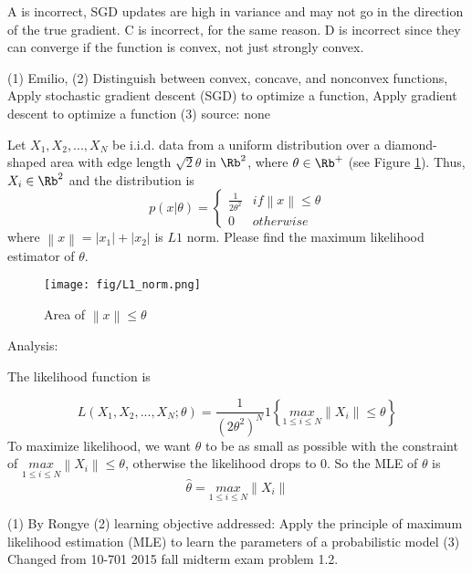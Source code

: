 \begin{questions}
\begin{soln}
    A is incorrect, SGD updates are high in variance and may not go in the direction of the true gradient. C is incorrect, for the same reason. D is incorrect since they can converge if the function is convex, not just strongly convex.
    \end{soln}
    \begin{qauthor}
    (1) Emilio, (2) Distinguish between convex, concave, and nonconvex functions, Apply stochastic gradient descent (SGD) to optimize a function, Apply gradient descent to optimize a function (3) source: none
    \end{qauthor}

\question [] Let $X_1,X_2,...,X_N$ be i.i.d. data from a uniform distribution over a diamond-shaped area with edge length $\sqrt{2}\theta$ in $\Rb^2$, where $\theta \in \Rb^+$ (see Figure \ref{L1_norm}). Thus, $X_i \in \Rb^2$ and the distribution is 
$$
p(x|\theta )=\left\{\begin{matrix}
 \frac{1}{2\theta ^2}& if \left \| x \right \|\leq \theta \\ 
 0&  otherwise
\end{matrix}\right.
$$
where $ \left \| x \right \| = |x_1|+|x_2|$ is $L1$ norm. Please find the maximum likelihood estimator of $\theta$.

\begin{figure}[H]
        \centering
        \texttt{[image: fig/L1\_norm.png]}
        \caption{Area of $\left \| x \right \|\leq \theta$}
        \label{L1_norm}
\end{figure}

    \begin{soln}
    Analysis:
    
    The likelihood function is
    
    $$
    L(X_1,X_2,...,X_N;\theta )=\frac{1}{(2\theta ^2)^N} 1\left \{\underset{1\leq i\leq N}{max} \left \| X_i \right \|\leq \theta \right \}
    $$
    To maximize likelihood, we want $\theta$ to be as small as possible with the constraint of $\underset{1\leq i\leq N}{max} \left \| X_i \right \|\leq \theta $, otherwise the likelihood drops to 0. So the MLE of $\theta$ is 
    $$
    \widehat{\theta}= \underset{1\leq i\leq N}{max} \left \| X_i \right \|
    $$
    
    \end{soln}
    \begin{qauthor}
    (1) By Rongye 
    (2) learning objective addressed: Apply the principle of maximum likelihood estimation (MLE) to learn the parameters of a probabilistic model 
    (3) Changed from 10-701 2015 fall midterm exam problem 1.2.
    \end{qauthor}


\end{questions}
